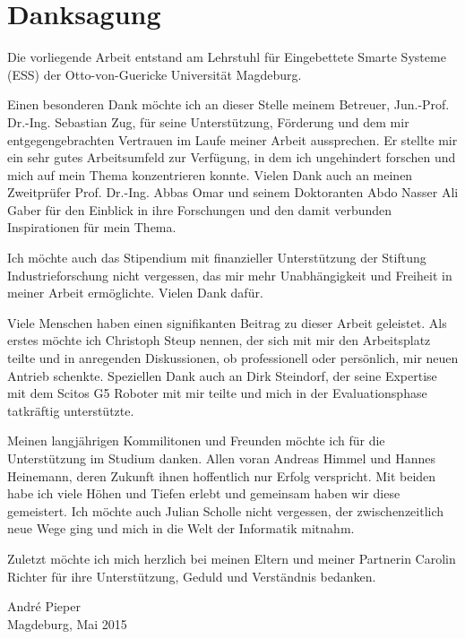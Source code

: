 \chapter*{Danksagung}
Die vorliegende Arbeit entstand am Lehrstuhl für Eingebettete Smarte Systeme (ESS) der Otto-von-Guericke Universität Magdeburg. \par\smallskip
Einen besonderen Dank möchte ich an dieser Stelle meinem Betreuer, Jun.-Prof. Dr.-Ing. Sebastian Zug, für seine Unterstützung, Förderung und dem mir entgegengebrachten Vertrauen im Laufe meiner Arbeit aussprechen. Er stellte mir ein sehr gutes Arbeitsumfeld zur Verfügung, in dem ich ungehindert forschen und mich auf mein Thema konzentrieren konnte. Vielen Dank auch an meinen Zweitprüfer Prof. Dr.-Ing. Abbas Omar und seinem Doktoranten Abdo Nasser Ali Gaber für den Einblick in ihre Forschungen und den damit verbunden Inspirationen für mein Thema. \par\smallskip
Ich möchte auch das Stipendium mit finanzieller Unterstützung der Stiftung Industrieforschung nicht vergessen, das mir mehr Unabhängigkeit und Freiheit in meiner Arbeit ermöglichte. Vielen Dank dafür. \par\smallskip
Viele Menschen haben einen signifikanten Beitrag zu dieser Arbeit geleistet. Als erstes möchte ich Christoph Steup nennen, der sich mit mir den Arbeitsplatz teilte und in anregenden Diskussionen, ob professionell oder persönlich, mir neuen Antrieb schenkte. Speziellen Dank auch an Dirk Steindorf, der seine Expertise mit dem Scitos G5 Roboter mit mir teilte und mich in der Evaluationsphase tatkräftig unterstützte. \par\smallskip
Meinen langjährigen Kommilitonen und Freunden möchte ich für die Unterstützung im Studium danken. Allen voran Andreas Himmel und Hannes Heinemann, deren Zukunft ihnen hoffentlich nur Erfolg verspricht. Mit beiden habe ich viele Höhen und Tiefen erlebt und gemeinsam haben wir diese gemeistert. Ich möchte auch Julian Scholle nicht vergessen, der zwischenzeitlich neue Wege ging und mich in die Welt der Informatik mitnahm. \par\smallskip
Zuletzt möchte ich mich herzlich bei meinen Eltern und meiner Partnerin Carolin Richter für ihre Unterstützung, Geduld und Verständnis bedanken.\par\medskip
\begin{flushright}
André Pieper\\
Magdeburg, Mai 2015
\end{flushright}  